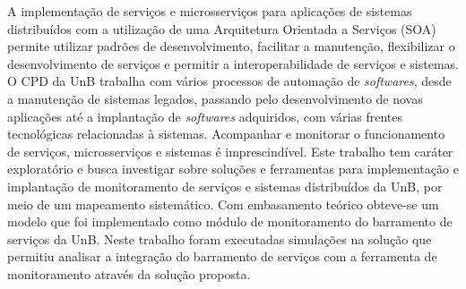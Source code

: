 A implementação de serviços e microsserviços para aplicações de sistemas distribuídos com a utilização de uma Arquitetura Orientada a Serviços (\acrshort{SOA}) permite utilizar padrões de desenvolvimento, facilitar a manutenção, flexibilizar o desenvolvimento de serviços e permitir a interoperabilidade de serviços e sistemas. O \acrfull{CPD} da \acrfull{UnB} trabalha com vários processos de automação de \textit{softwares}, desde a manutenção de sistemas legados, passando pelo desenvolvimento de novas aplicações até a implantação de \textit{softwares} adquiridos, com várias frentes tecnológicas relacionadas à sistemas. Acompanhar e monitorar o funcionamento de serviços, microsserviços e sistemas é imprescindível. Este trabalho tem caráter exploratório e busca investigar sobre soluções e ferramentas para implementação e implantação de monitoramento de serviços e sistemas distribuídos da \acrfull{UnB}, por meio de um mapeamento sistemático. Com embasamento teórico obteve-se um modelo que foi implementado como módulo de monitoramento do barramento de serviços da \acrfull{UnB}. Neste trabalho foram executadas simulações na solução que permitiu analisar a integração do barramento de serviços com a ferramenta de monitoramento através da solução proposta.